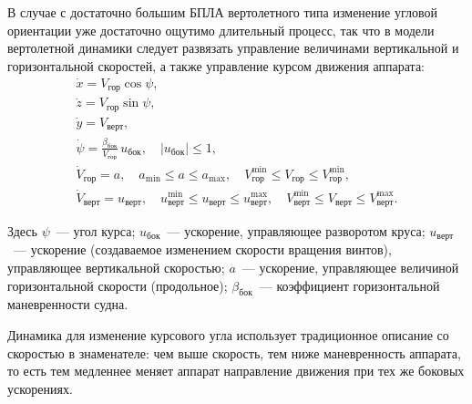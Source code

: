 \documentclass[a4paper,12pt]{article}
\begin{document}
В случае с достаточно большим БПЛА вертолетного типа изменение угловой ориентации уже достаточно ощутимо длительный процесс, так что в модели вертолетной динамики следует развязать управление величинами вертикальной и горизонтальной скоростей, а также управление курсом движения аппарата:
\begin{equation*}
  \begin{array}{l}
    \dot x = V_\text{гор} \cos \psi, \\[0.75ex]
    \dot z = V_\text{гор} \sin \psi, \\[0.75ex]
    \dot y = V_\text{верт}, \\[0.75ex]
    \dot \psi   = \frac{\beta_\text{бок}}{V_\text{гор}} \, u_\text{бок}, \quad |u_\text{бок}| \leqslant 1, \\[0.75ex]
    \dot V_\text{гор} = a, \quad  
      a_{\min} \leqslant a \leqslant a_{\max},
      \quad V^{\min}_\text{гор} \leqslant V_\text{гор} \leqslant V^{\min}_\text{гор}, \\[0.75ex]
    \dot V_\text{верт} = u_\text{верт},
      \quad u^{\min}_\text{верт} \leqslant u_\text{верт} \leqslant u^{\max}_\text{верт}, \quad
      V^{\min}_\text{верт} \leqslant V_\text{верт} \leqslant V^{\max}_\text{верт}.
  \end{array}
\end{equation*}

Здесь $\psi$~--- угол курса; $u_\text{бок}$~--- ускорение, управляющее разворотом круса; $u_\text{верт}$~--- ускорение (создаваемое изменением скорости вращения винтов), управляющее вертикальной скоростью; $a$~--- ускорение, управляющее величиной горизонтальной скорости (продольное); $\beta_\text{бок}$~--- коэффициент горизонтальной маневренности судна.

Динамика для изменение курсового угла использует традиционное описание со скоростью в знаменателе: чем выше скорость, тем ниже маневренность аппарата, то есть тем медленнее меняет аппарат направление движения при тех же боковых ускорениях.
\end{document}
